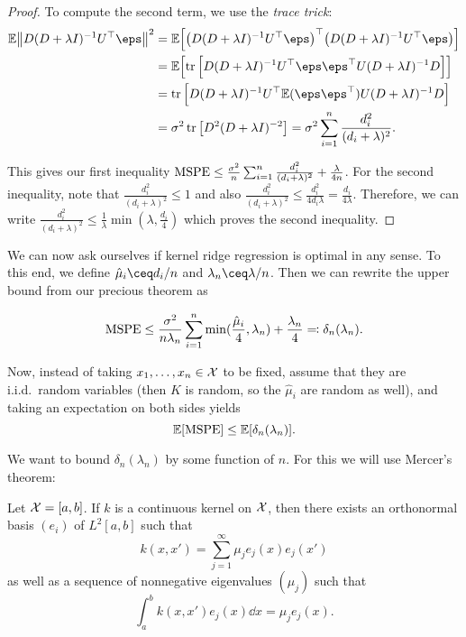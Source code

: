 \begin{proof}
To compute the second term, we use the \emph{trace trick}:
\begin{align*}
	\EE \norm{D(D + \lambda I)^{-1} U\T \eps}^2 &= \EE\qty[ \qty(D(D + \lambda I)^{-1} U\T \eps)\T \qty(D(D + \lambda I)^{-1} U\T \eps)] \\
	&= \EE \qty[\tr\qty[D(D + \lambda I)^{-1} U\T \eps \eps\T U (D + \lambda I)^{-1} D]] \\
	&= \tr\qty[ D(D + \lambda I)^{-1} U\T \EE(\eps\eps\T) U (D + \lambda I)^{-1} D] \\
	&= \sigma^2 \tr \qty[ D^2 (D + \lambda I)^{-2}] = \sigma^2 \sum_{i=1}^n \frac{d_i^2}{(d_i + \lambda)^2}.
\end{align*}

This gives our first inequality $\operatorname{MSPE} \leq \frac{\sigma^2}{n} \sum_{i=1}^n \frac{d_i^2}{(d_i + \lambda)^2} + \frac\lambda{4n}$. For the second inequality, note that $\frac{d_i^2}{(d_i + \lambda)^2} \leq 1$ and also $\frac{d_i^2}{(d_i + \lambda)^2} \leq \frac{d_i^2}{4 d_i\lambda} = \frac{d_i}{4\lambda}$. Therefore, we can write $\frac{d_i^2}{(d_i + \lambda)^2} \leq \frac1\lambda \min(\lambda, \frac{d_i}{4})$ which proves the second inequality. 
\end{proof}

We can now ask ourselves if kernel ridge regression is optimal in any sense. To this end, we define $\hat \mu_i \ceq d_i / n$ and $\lambda_n \ceq \lambda/n$. Then we can rewrite the upper bound from our precious theorem as

\[
\operatorname{MSPE} \leq \frac{\sigma^2}{n \lambda_n} \sum_{i=1}^n \min(\frac{\hat \mu_i}{4}, \lambda_n) + \frac{\lambda_n}{4} \eqqcolon \delta_n(\lambda_n).  
\]

Now, instead of taking $x_1, \dotsc, x_n \in \mathcal X$ to be fixed, assume that they are i.i.d.\ random variables (then $K$ is random, so the $\hat\mu_i$ are random as well), and taking an expectation on both sides yields
\[
\mathbb E[\operatorname{MSPE}] \leq \mathbb E[\delta_n(\lambda_n)]. 
\]

We want to bound $\delta_n(\lambda_n)$ by some function of $n$. For this we will use Mercer's theorem:
\begin{theorem}[Mercer]
	Let $\mathcal X = [a, b]$. If $k$ is a continuous kernel on $\mathcal X$, then there exists an orthonormal basis $(e_i)$ of $L^2[a, b]$ such that
	\[
	k(x, x') = \sum_{j=1}^\infty \mu_j e_j(x) e_j(x')
	\]
	as well as a sequence of nonnegative eigenvalues $(\mu_j)$ such that
	\[
	\int_a^b k(x, x') e_j(x) \dd{x} = \mu_j e_j(x). 
	\]
\end{theorem}

